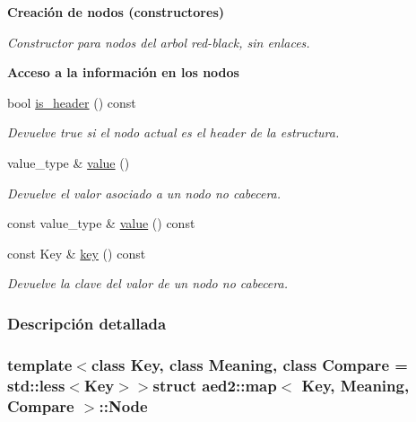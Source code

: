 \begin{Indent}{\bf \-Creación de nodos (constructores)}
\begin{Indent}
\begin{DoxyCompactItemize}
\begin{DoxyCompactList}\small\item\em \-Constructor para nodos del arbol red-\/black, sin enlaces. \end{DoxyCompactList}\end{DoxyCompactItemize}
\end{Indent}
\begin{Indent}{\bf \-Acceso a la información en los nodos}\par
\begin{DoxyCompactItemize}
\item 
bool \hyperlink{structaed2_1_1map_1_1Node_ae6cc4598a60dbab7120ffae58ebbadca_ae6cc4598a60dbab7120ffae58ebbadca}{is\-\_\-header} () const 
\begin{DoxyCompactList}\small\item\em \-Devuelve true si el nodo actual es el header de la estructura. \end{DoxyCompactList}\item 
value\-\_\-type \& \hyperlink{structaed2_1_1map_1_1Node_af4ada8e79dabb4849fc87de63d3970fb_af4ada8e79dabb4849fc87de63d3970fb}{value} ()
\begin{DoxyCompactList}\small\item\em \-Devuelve el valor asociado a un nodo no cabecera. \end{DoxyCompactList}\item 
const value\-\_\-type \& \hyperlink{structaed2_1_1map_1_1Node_a747a33f40ad748d750372fe73aea0b32_a747a33f40ad748d750372fe73aea0b32}{value} () const 
\item 
const \-Key \& \hyperlink{structaed2_1_1map_1_1Node_a5451f8da0b7ad3582fab1decad5d09cb_a5451f8da0b7ad3582fab1decad5d09cb}{key} () const 
\begin{DoxyCompactList}\small\item\em \-Devuelve la clave del valor de un nodo no cabecera. \end{DoxyCompactList}\end{DoxyCompactItemize}
\end{Indent}


\subsubsection{\-Descripción detallada}
\subsubsection*{template$<$class \-Key, class \-Meaning, class \-Compare = std\-::less$<$\-Key$>$$>$struct aed2\-::map$<$ Key, Meaning, Compare $>$\-::\-Node}


\end{Indent}
